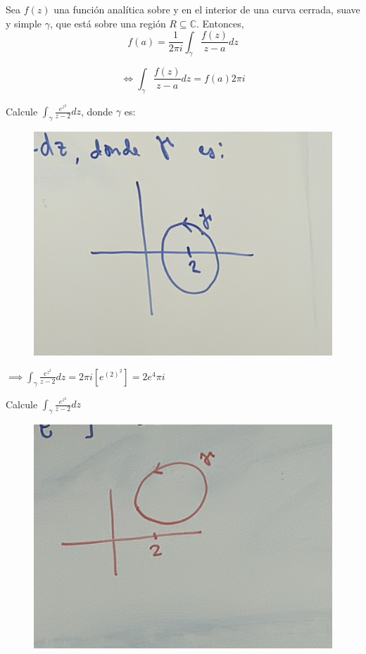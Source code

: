 \begin{teorema}
    Sea $f(z)$ una función analítica sobre y en el interior de una curva cerrada, suave y simple $\gamma$, que está sobre una región $R\subseteq \mathbb{C}$. Entonces, 
    $$f(a)=\frac{1}{2\pi i}\int_\gamma\frac{f(z)}{z-a}dz$$
    \begin{cajita}
        $$\iff \int_\gamma \frac{f(z)}{z-a}dz = f(a)2\pi i$$
    \end{cajita}
\end{teorema}

\begin{ejemplo}
    Calcule $\int_\gamma \frac{e^{z^2}}{z-2}dz$, donde $\gamma$ es: 
    \begin{figure}[H]
        \centering
        \includegraphics[scale=0.1]{imagenes/13.1.jpeg}
    \end{figure}
    $\implies \int_\gamma \frac{e^{z^2}}{z-2}dz =2\pi i[e^{(2)^2}]=2e^4\pi i$
    \begin{cajita}
        \begin{ejemplo}
            Calcule $\int_\gamma\frac{e^{z^2}}{z-2}dz$
            \begin{figure}[H]
                \centering
                \includegraphics[scale=0.1]{imagenes/13.2.jpeg}

\end{figure}
\end{ejemplo}
\end{cajita}
\end{ejemplo}
